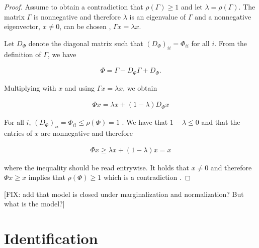 \documentclass[accepted]{uai2021} %
\begin{document}
\begin{proof}
	Assume to obtain a contradiction that $\rho(\Gamma) \geq 1$ and let 
	$\lambda = \rho(\Gamma)$. The matrix $\Gamma$ is nonnegative and therefore 
	$\lambda$ is an eigenvalue of $\Gamma$ and a nonnegative eigenvector, $x 
	\neq 0$, 
	can be chosen \citep[Theorem 8.3.1]{horn1985}, $\Gamma x = \lambda x$.
	
	Let $D_\Phi$ denote the diagonal matrix such that $(D_{\Phi})_{ii} = 
	\Phi_{ii}$ for all $i$. From the definition of $\Gamma$, we have
	
	\begin{align*}
		\Phi= \Gamma - D_\Phi\Gamma + D_\Phi.
	\end{align*}
	
	Multiplying with $x$ and using $\Gamma x = \lambda x$, we obtain
	
	\begin{align*}
		\Phi x = \lambda x + (1- \lambda)D_\Phi x
	\end{align*}
	
	For all $i$, $(D_\Phi)_{ii} = \Phi_{ii}\leq \rho(\Phi) = 1$ 
	\citep[Corollary 
	8.1.20]{horn1985}. We have that $1 - \lambda \leq 0$ and that the entries 
	of $x$ are nonnegative and therefore
	
	\begin{align*}
		\Phi x \geq \lambda x  + (1- \lambda) x = x
	\end{align*}
	
	where the inequality should be read entrywise. It holds that $x \neq 0$ and 
	therefore $\Phi x \geq x$ implies that $\rho(\Phi) \geq 1$ which is a 
	contradiction \citep[Theorem 8.3.2]{horn1985}.
\end{proof}

[FIX: add that model is closed under marginalization and normalization? But 
what is the model?]


\section{Identification}
\label{sec:id}
\end{document}
